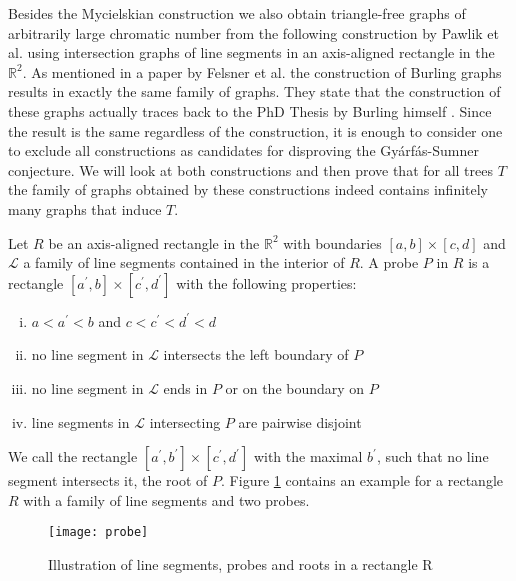 Besides the Mycielskian construction we also obtain triangle-free graphs of arbitrarily large chromatic number from the following construction by Pawlik et al. \cite{Paw14} using intersection graphs of line segments in an axis-aligned rectangle in the $\mathbb{R}^2$. As mentioned in a paper by Felsner et al. \cite{Fe18} the construction of Burling graphs results in exactly the same family of graphs. They state that the construction of these graphs actually traces back to the PhD Thesis by Burling himself \cite{Bu65}. Since the result is the same regardless of the construction, it is enough to consider one to exclude all constructions as candidates for disproving the Gyárfás-Sumner conjecture. We will look at both constructions and then prove that for all trees $T$ the family of graphs obtained by these constructions indeed contains infinitely many graphs that induce $T$.

\begin{defn}
Let $R$ be an axis-aligned rectangle in the $\mathbb{R}^2$ with boundaries $[a,b]\times [c,d]$ and $\mathcal{L}$ a family of line segments contained in the interior of $R$. A probe $P$ in $R$ is a rectangle $[a^\prime ,b]\times [c^\prime ,d^\prime]$ with the following properties:
\begin{enumerate}[(i)]
\item $a<a^\prime < b$ and $c<c^\prime <d^\prime < d$
\item no line segment in $\mathcal{L}$ intersects the left boundary of $P$
\item no line segment in $\mathcal{L}$ ends in $P$ or on the boundary on $P$
\item line segments in $\mathcal{L}$ intersecting $P$ are pairwise disjoint
\end{enumerate}
We call the rectangle $[a^\prime ,b^\prime ]\times [c^\prime ,d^\prime]$ with the maximal $b^\prime$, such that no line segment intersects it, the root of $P$. Figure \ref{f1ls} contains an example for a rectangle $R$ with a family of line segments and two probes.
\end{defn}

\begin{figure}[ht]
\begin{center}
\texttt{[image: probe]}
\end{center}
\caption{Illustration of line segments, probes and roots in a rectangle R}
\label{f1ls}
\end{figure}


